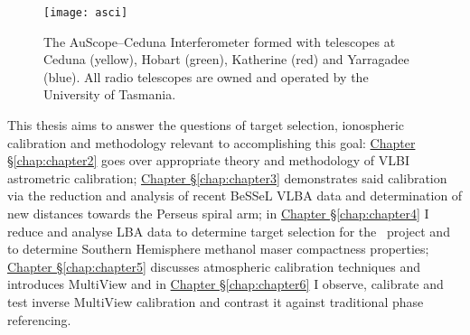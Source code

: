         \begin{SCfigure}
        	\centering
        	\texttt{[image: asci]}
        	\caption[ASCI Array]{The AuScope--Ceduna Interferometer formed with telescopes at Ceduna (yellow), Hobart (green), Katherine (red) and Yarragadee (blue). All radio telescopes are owned and operated by the University of Tasmania.}
        	\label{fig:asci}
        \end{SCfigure}
        
        \newpage
        This thesis aims to answer the questions of target selection, ionospheric calibration and methodology relevant to accomplishing this goal: \hyperref[chap:chapter2]{Chapter \S\ref*{chap:chapter2}} goes over appropriate theory and methodology of VLBI astrometric calibration; \hyperref[chap:chapter3]{Chapter \S\ref*{chap:chapter3}} demonstrates said calibration via the reduction and analysis of recent BeSSeL VLBA data and determination of new distances towards the Perseus spiral arm; in \hyperref[chap:chapter4]{Chapter \S\ref*{chap:chapter4}} I reduce and analyse LBA data to determine target selection for the \spirals\, project and to determine Southern Hemisphere methanol maser compactness properties; \hyperref[chap:chapter5]{Chapter \S\ref*{chap:chapter5}} discusses atmospheric calibration techniques and introduces MultiView and in \hyperref[chap:chapter6]{Chapter \S\ref*{chap:chapter6}} I observe, calibrate and test inverse MultiView calibration and contrast it against traditional phase referencing.
        
        
       
        
        


